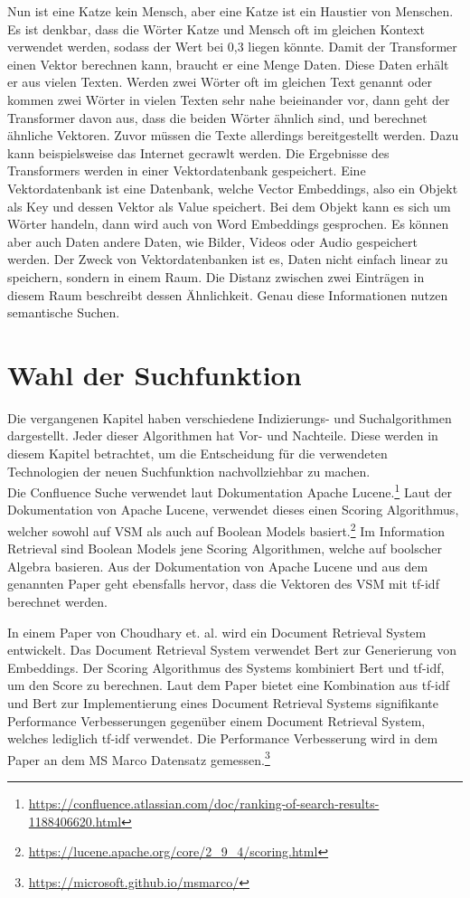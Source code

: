 Nun ist eine Katze kein Mensch, aber eine Katze ist ein Haustier von Menschen.
Es ist denkbar, dass die Wörter Katze und Mensch oft im gleichen Kontext verwendet werden, sodass der Wert bei 0,3 liegen könnte.
Damit der Transformer einen Vektor berechnen kann, braucht er eine Menge Daten.
Diese Daten erhält er aus vielen Texten.
Werden zwei Wörter oft im gleichen Text genannt oder kommen zwei Wörter in vielen Texten sehr nahe beieinander vor, dann geht der Transformer davon aus, dass die beiden Wörter ähnlich sind, und berechnet ähnliche Vektoren.
Zuvor müssen die Texte allerdings bereitgestellt werden.
Dazu kann beispielsweise das Internet gecrawlt werden.
Die Ergebnisse des Transformers werden in einer Vektordatenbank gespeichert.
Eine Vektordatenbank ist eine Datenbank, welche Vector Embeddings, also ein Objekt als Key und dessen Vektor als Value speichert.
Bei dem Objekt kann es sich um Wörter handeln, dann wird auch von Word Embeddings gesprochen.
Es können aber auch Daten andere Daten, wie Bilder, Videos oder Audio gespeichert werden.
Der Zweck von Vektordatenbanken ist es, Daten nicht einfach linear zu speichern, sondern in einem Raum.
Die Distanz zwischen zwei Einträgen in diesem Raum beschreibt dessen Ähnlichkeit.
Genau diese Informationen nutzen semantische Suchen.

\section{Wahl der Suchfunktion}
Die vergangenen Kapitel haben verschiedene Indizierungs- und Suchalgorithmen dargestellt.
Jeder dieser Algorithmen hat Vor- und Nachteile.
Diese werden in diesem Kapitel betrachtet, um die Entscheidung für die verwendeten Technologien der neuen Suchfunktion nachvollziehbar zu machen.\\

Die Confluence Suche verwendet laut Dokumentation Apache Lucene.\footnote{\url{https://confluence.atlassian.com/doc/ranking-of-search-results-1188406620.html}}
Laut der Dokumentation von Apache Lucene, verwendet dieses einen Scoring Algorithmus, welcher sowohl auf VSM als auch auf Boolean Models basiert.\footnote{\url{https://lucene.apache.org/core/2_9_4/scoring.html}}
Im Information Retrieval sind Boolean Models jene Scoring Algorithmen, welche auf boolscher Algebra basieren.
Aus der Dokumentation von Apache Lucene und aus dem genannten Paper geht ebensfalls hervor, dass die Vektoren des VSM mit tf-idf berechnet werden.

In einem Paper von Choudhary et. al. wird ein Document Retrieval System entwickelt.\cite{Choudhary_Guttikonda_Chowdhury_Learmonth_2020}
Das Document Retrieval System verwendet Bert zur Generierung von Embeddings.
Der Scoring Algorithmus des Systems kombiniert Bert und tf-idf, um den Score zu berechnen.
Laut dem Paper bietet eine Kombination aus tf-idf und Bert zur Implementierung eines Document Retrieval Systems signifikante Performance Verbesserungen gegenüber einem Document Retrieval System, welches lediglich tf-idf verwendet.
Die Performance Verbesserung wird in dem Paper an dem MS Marco Datensatz gemessen.\footnote{\url{https://microsoft.github.io/msmarco/}}\\

